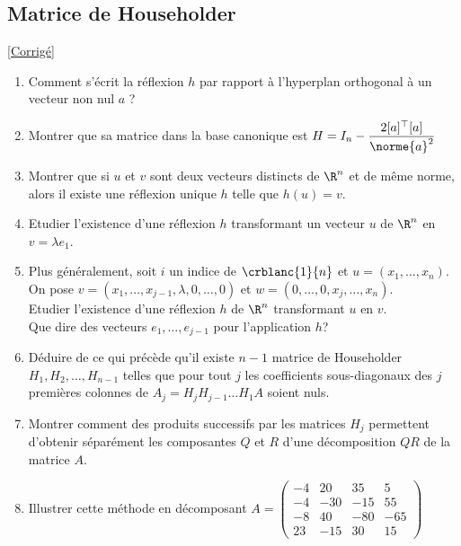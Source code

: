 \documentclass[8pt]{book}
\begin{document}
\subsection{Matrice de Householder}
\label{Matrice de Householder}
\textcolor{blue}{\hyperref[Matrice de Householder corrigé]{[Corrigé]}}\\
\begin{enumerate}[leftmargin=*]
	\item Comment s'écrit la réflexion $h$ par rapport à l'hyperplan orthogonal à un vecteur non nul $a$ ?
	\item Montrer que sa matrice dans la base canonique est $H=I_n-\displaystyle\frac{2[a]^\top[a]}{\norme{a}^2}$
	\item Montrer que si $u$ et $v$ sont deux vecteurs distincts de $\R^n$ et de même norme, alors il existe une réflexion unique $h$ telle que $h(u)=v$.
	\item Etudier l'existence d'une réflexion $h$ transformant un vecteur $u$ de $\R^n$ en $v=\lambda e_1$.
	\item Plus généralement, soit $i$ un indice de $\crblanc{1}{n}$ et $u=(x_1,\dots,x_n)$. On pose $v=(x_1,\dots,x_ {j-1},\lambda,0,\dots,0)$ et $w=(0,\dots,0,x_j,\dots,x_n)$.
	\\Etudier l'existence d'une réflexion $h$ de $\R^n$ transformant $u$ en $v$.
	\\Que dire des vecteurs $e_1,\dots,e_{j-1}$ pour l'application $h$?
	\item Déduire de ce qui précède qu'il existe $n-1$ matrice de Householder $H_1,H_2,\dots,H_{n-1}$ telles que pour tout $j$ les coefficients sous-diagonaux des $j$ premières colonnes de $A_j=H_jH_{j-1}\dots H_1A$ soient nuls.
	\item Montrer comment des produits successifs par les matrices $H_j$ permettent d'obtenir séparément les composantes $Q$ et $R$ d'une décomposition $QR$ de la matrice $A$.
	\item Illustrer cette méthode en décomposant $A=\begin{pmatrix}
		-4&20&35&5\\
		-4&-30&-15&55\\
		-8&40&-80&-65\\
		23&-15&30&15
	\end{pmatrix}$
\end{enumerate}
\end{document}
